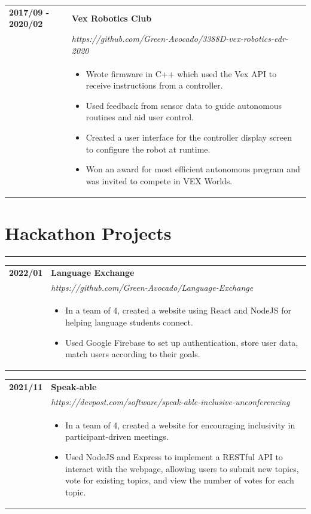 \documentclass[letterpaper]{article}
\newcommand{\sectcolor}{cyan}
\newcommand{\sect}[1]{\section*{#1}
                        {\color{\sectcolor}
                        \rule{\textwidth}{1pt}
                        \vspace{-4pt}}}
\begin{document}
        \begin{tabular}{p{} p{}}
            \textbf{2017/09 - 2020/02} & \textbf{Vex Robotics Club} \\
            & \emph{https://github.com/Green-Avocado/3388D-vex-robotics-edr-2020} \\
            & \begin{itemize}
                \item Wrote firmware in C++ which used the Vex API to receive instructions from a
                    controller.
                \item Used feedback from sensor data to guide autonomous routines and aid user control.
                \item Created a user interface for the controller display screen to configure the robot at
                    runtime.
                \item Won an award for most efficient autonomous program and was invited to compete in VEX
                    Worlds.
            \end{itemize}
        \end{tabular}

    \sect{Hackathon Projects}

        \begin{tabular}{p{} p{}}
            \textbf{2022/01} & \textbf{Language Exchange} \\
            & \emph{https://github.com/Green-Avocado/Language-Exchange} \\
            & \begin{itemize}
                \item In a team of 4, created a website using React and NodeJS for helping language
                    students connect.
                \item Used Google Firebase to set up authentication, store user data, match users
                    according to their goals.
            \end{itemize}
        \end{tabular}

        \begin{tabular}{p{} p{}}
            \textbf{2021/11} & \textbf{Speak-able} \\
            & \emph{https://devpost.com/software/speak-able-inclusive-unconferencing} \\
            & \begin{itemize}
                \item In a team of 4, created a website for encouraging inclusivity in
                    participant-driven meetings.
                \item Used NodeJS and Express to implement a RESTful API to interact with the webpage,
                    allowing users to submit new topics, vote for existing topics, and view the number
                    of votes for each topic.
            \end{itemize}
        \end{tabular}
\end{document}

